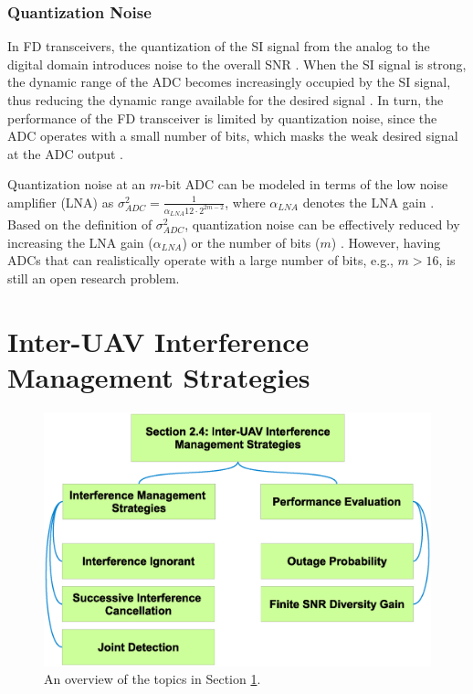 \subsubsection{Quantization Noise}
In FD transceivers, the quantization of the SI signal from the analog to the digital domain introduces noise to the overall SNR \cite{ahmed2015all,ahmed2013rate}. When the SI signal is strong, the dynamic range of the ADC becomes increasingly occupied by the SI signal, thus reducing the dynamic range available for the desired signal \cite{korpi2014full}. In turn, the performance of the FD transceiver is limited by quantization noise, since the ADC operates with a small number of bits, which masks the weak desired signal at the ADC output \cite{ahmed2013rate,bernhardt2018self}.

Quantization noise at an $m$-bit ADC can be modeled in terms of the low noise amplifier (LNA) as $\sigma_{ADC}^2 = \frac{1}{\alpha_{LNA} 12 \cdot 2^{2m-2}}$, where $\alpha_{LNA}$ denotes the LNA gain \cite{ahmed2015all,ahmed2013rate}. Based on the definition of $\sigma_{ADC}^2$, quantization noise can be effectively reduced by increasing the LNA gain ($\alpha_{LNA}$) or the number of bits ($m$) \cite{ahmed2015all}. However, having ADCs that can realistically operate with a large number of bits, e.g., $m>16$, is still an open research problem.

\section{Inter-UAV Interference Management Strategies} \label{lit_review_sec_hd_uav_int}

\begin{figure} [tpb]
\centering
\includegraphics [width=0.7\columnwidth]{chap2_fig/sec_4_taxonomy.eps} 
\vspace{-0.5cm}
\caption{An overview of the topics in Section \ref{lit_review_sec_hd_uav_int}.}
\label{fig:lit_review_sec_4_taxonomy}
\end{figure}

